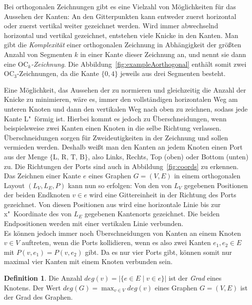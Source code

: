 \documentclass[a4paper]{scrreprt}
\theoremstyle{definition}
\newtheorem{definition}[satz]{Definition}
\begin{document}
Bei orthogonalen Zeichnungen gibt es eine Vielzahl von Möglichkeiten für das Aussehen der Kanten: An den Gitterpunkten kann entweder zuerst horizontal oder zuerst vertikal weiter gezeichnet werden. Wird immer abwechselnd horizontal und vertikal gezeichnet, entstehen viele Knicke in den Kanten. Man gibt die \emph{Komplexität} einer orthogonalen Zeichnung in Abhängigkeit der größten Anzahl von Segmenten $k$ in einer Kante dieser Zeichnung an, und nennt sie dann eine \emph{$\text{OC}_k$-Zeichnung}. Die Abbildung~\ref{fig:exampleAorthogonal} enthält somit zwei OC$_3$-Zeichnungen, da die Kante $\{0,4\}$ jeweils aus drei Segmenten besteht.

Eine Möglichkeit, das Aussehen der zu normieren und gleichzeitig die Anzahl der Knicke zu minimieren, wäre es, immer den vollständigen horizontalen Weg am unteren Knoten und dann den vertikalen Weg nach oben zu zeichnen, sodass jede Kante L"~förmig ist. Hierbei kommt es jedoch zu Überschneidungen, wenn beispielsweise zwei Kanten einen Knoten in die selbe Richtung verlassen. Überschneidungen sorgen für Zweideutigkeiten in der Zeichnung und sollen vermieden werden. Deshalb weißt man den Kanten an jedem Knoten einen Port aus der Menge $\{\text{L, R, T, B}\}$, also Links, Rechts, Top (oben) oder Bottom (unten) zu. Die Richtungen der Ports sind auch in Abbildung~\ref{fig:coords} zu erkennen.
\\

Das Zeichnen einer Kante $e$ eines Graphen $G = (V,E)$ in einem orthogonalen Layout $(L_V,L_E,P)$ kann nun so erfolgen: Von den von $L_V$ gegebenen Positionen der beiden Endknoten $v \in e$ wird eine Gittereinheit in der Richtung des Ports gezeichnet. Von diesen Positionen aus wird eine horizontale Linie bis zur x"~Koordinate des von $L_E$ gegebenen Kantenorts gezeichnet. Die beiden Endpositionen werden mit einer vertikalen Linie verbunden. %
\\

Es können jedoch immer noch Überschneidungen von Kanten an einem Knoten $v \in V$ auftreten, wenn die Ports kollidieren, wenn es also zwei Kanten $e_1, e_2 \in E$ mit $P(v, e_1) = P(v, e_2)$ gibt. Da es nur vier Ports gibt, können somit nur maximal vier Kanten mit einem Knoten verbunden sein.

\begin{definition}
  Die Anzahl $deg(v) = |\{e \in E \mid v \in e\}|$ ist der \emph{Grad} eines Knotens. Der Wert $deg(G) = \max_{v \in V}{deg(v)}$ eines Graphen $G = (V, E)$ ist der Grad des Graphen.
\end{definition}
\end{document}
